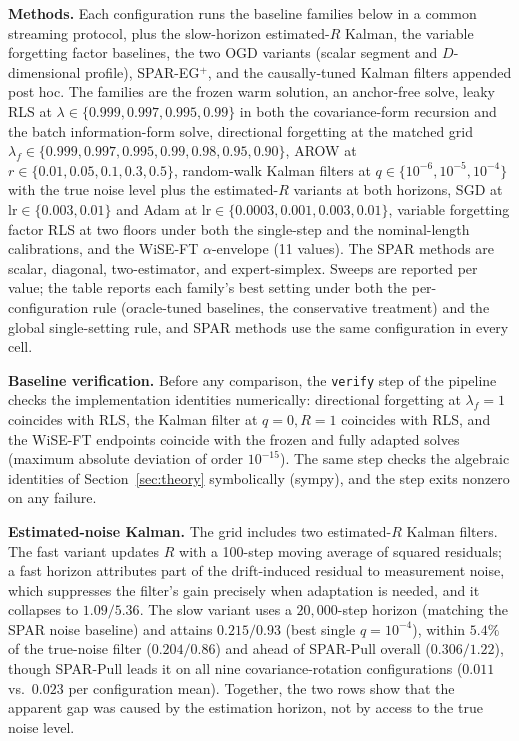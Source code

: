 \textbf{Methods.}
Each configuration runs the baseline families below in a common streaming protocol, plus the slow-horizon estimated-$R$ Kalman, the variable forgetting factor baselines, the two OGD variants (scalar segment and $D$-dimensional profile), SPAR-EG$^+$, and the causally-tuned Kalman filters appended post hoc. The families are the frozen warm solution, an anchor-free solve, leaky RLS at $\lambda \in \{0.999, 0.997, 0.995, 0.99\}$ in both the covariance-form recursion and the batch information-form solve, directional forgetting at the matched grid $\lambda_f \in \{0.999, 0.997, 0.995, 0.99, 0.98, 0.95, 0.90\}$, AROW at $r \in \{0.01, 0.05, 0.1, 0.3, 0.5\}$, random-walk Kalman filters at $q \in \{10^{-6}, 10^{-5}, 10^{-4}\}$ with the true noise level plus the estimated-$R$ variants at both horizons, SGD at $\mathrm{lr} \in \{0.003, 0.01\}$ and Adam at $\mathrm{lr} \in \{0.0003, 0.001, 0.003, 0.01\}$, variable forgetting factor RLS at two floors under both the single-step and the nominal-length calibrations, and the WiSE-FT $\alpha$-envelope (11 values). The SPAR methods are scalar, diagonal, two-estimator, and expert-simplex.
Sweeps are reported per value; the table reports each family's best setting under both the per-configuration rule (oracle-tuned baselines, the conservative treatment) and the global single-setting rule, and SPAR methods use the same configuration in every cell.

\textbf{Baseline verification.}
Before any comparison, the \texttt{verify} step of the pipeline checks the implementation identities numerically: directional forgetting at $\lambda_f = 1$ coincides with RLS, the Kalman filter at $q = 0, R = 1$ coincides with RLS, and the WiSE-FT endpoints coincide with the frozen and fully adapted solves (maximum absolute deviation of order $10^{-15}$).
The same step checks the algebraic identities of Section~\ref{sec:theory} symbolically (sympy), and the step exits nonzero on any failure.

\textbf{Estimated-noise Kalman.}
The grid includes two estimated-$R$ Kalman filters.
The fast variant updates $R$ with a 100-step moving average of squared residuals; a fast horizon attributes part of the drift-induced residual to measurement noise, which suppresses the filter's gain precisely when adaptation is needed, and it collapses to $1.09/5.36$.
The slow variant uses a $20{,}000$-step horizon (matching the SPAR noise baseline) and attains $0.215/0.93$ (best single $q = 10^{-4}$), within $5.4\%$ of the true-noise filter ($0.204/0.86$) and ahead of SPAR-Pull overall ($0.306/1.22$), though SPAR-Pull leads it on all nine covariance-rotation configurations ($0.011$ vs.\ $0.023$ per configuration mean).
Together, the two rows show that the apparent gap was caused by the estimation horizon, not by access to the true noise level.

